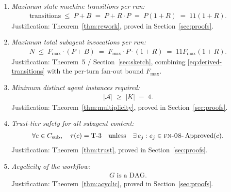 \documentclass[12pt]{article}
\theoremstyle{definition}
\newcommand{\FN}[1]{\textsc{fn-#1}}
\DeclareMathOperator{\Approved}{Approved}
\begin{document}
\begin{enumerate}
  \item \emph{Maximum state-machine transitions per run:}
        \begin{align}
          \text{transitions} \;\leq\; P + B
          \;=\; P + R \cdot P
          \;=\; P(1 + R)
          \;=\; 11(1 + R).
          \label{eq:derived-transitions}
        \end{align}
        Justification: Theorem~\ref{thm:rework}, proved in
        Section~\ref{sec:proofs}.

  \item \emph{Maximum total subagent invocations per run:}
        \begin{align}
          N
          \;\leq\;
          F_{\max} \cdot (P + B)
          \;=\; F_{\max} \cdot P \cdot (1 + R)
          \;=\; 11 F_{\max}(1 + R).
          \label{eq:derived-invocations}
        \end{align}
        Justification: Theorem~5 / Section~\ref{sec:sketch},
        combining \eqref{eq:derived-transitions} with the per-turn
        fan-out bound $F_{\max}$.

  \item \emph{Minimum distinct agent instances required:}
        \begin{align}
          |\mathcal{A}| \;\geq\; |K| \;=\; 4.
          \label{eq:derived-multiplicity}
        \end{align}
        Justification: Theorem~\ref{thm:multiplicity}, proved in
        Section~\ref{sec:proofs}.

  \item \emph{Trust-tier safety for all subagent content:}
        \begin{align}
          \forall c \in C_{\mathrm{sub}},\quad
          \tau(c) = \mathrm{T\text{-}3}
          \quad\text{unless}\quad
          \exists\, e_j : e_j \in \FN{08}{\text{-}}\Approved(c).
          \label{eq:derived-trust}
        \end{align}
        Justification: Theorem~\ref{thm:trust}, proved in
        Section~\ref{sec:proofs}.

  \item \emph{Acyclicity of the workflow:}
        \begin{align}
          G \text{ is a DAG}.
          \label{eq:derived-acyclic}
        \end{align}
        Justification: Theorem~\ref{thm:acyclic}, proved in
        Section~\ref{sec:proofs}.
\end{enumerate}
\end{document}
